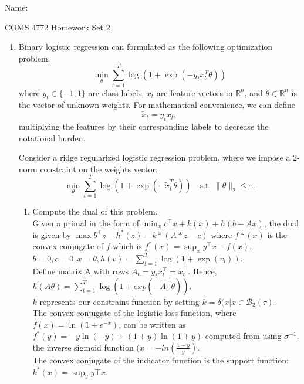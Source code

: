 \documentclass[12pt]{amsart}
\begin{document}
{\Large Name:}  \\
\begin{center}
\Large COMS 4772 \hskip 2in Homework Set 2
\end{center}
\bigskip



\noindent

\begin{enumerate}
\item Binary logistic regression can formulated as the following optimization problem: 
\[
\min_{\theta} \sum_{t = 1}^T \log(1 + \exp(-y_t x_t^T\theta)) 
\] 
where $y_t \in \{-1, 1\}$ are class labels, $x_t$ are feature vectors in $\mathbb{R}^n$, and $\theta \in \mathbb{R}^n$ is the vector of unknown weights.  
For mathematical convenience, we can define 
\[
\tilde x_t = y_t x_t,
\]
multiplying the features by their corresponding labels to decrease the notational burden. 

Consider a ridge regularized logistic regression problem, where we impose a 2-norm constraint on the weights vector: 
\[
\min_{\theta} \sum_{t = 1}^T \log(1 + \exp(-\tilde x_t^T\theta)) \quad \text{s.t. } \|\theta\|_2 \leq \tau. 
\] 

\begin{enumerate}
\item { Compute the dual of this problem. } \\

\noindent
Given a primal in the form of $\min_x c^\top x + k(x) + h(b-Ax)$, the dual is given by $\max b^\top z - h^*(z) - k*(A*z - c)$ where $f*(x)$ is the convex conjugate of $f$ which is $f^*(x) = \sup_x y^\top x - f(x)$. \\

$b=0, c=0, x = \theta, h(v) = \sum_{t=1}^T \log(1+\exp(v_i))$. \\ 
Define matrix A with rows $A_t = y_t x_t^\top = \tilde x_t^\top$.  Hence, $h(A\theta) = \sum_{t=1}^T \log(1 + exp(-\tilde A_t^\top \theta))$.\\
$k$ represents our constraint function by setting $k = \delta(x|x\in \mathcal{B}_2(\tau)$.\\ 

The convex conjugate of the logistic loss function, where $f(x) = \ln(1+e^{-x})$, can be written as $f^*(y) = -y \ln(-y) + (1+y)\ln(1+y)$ computed from using $\sigma^{-1}$, the inverse sigmoid function $(x = -ln(\frac{1-y}{y})$.\\

The convex conjugate of the indicator function is the support function: $k^*(x) = \sup_y y\top x$.


\end{enumerate}
\end{enumerate}
\end{document}
